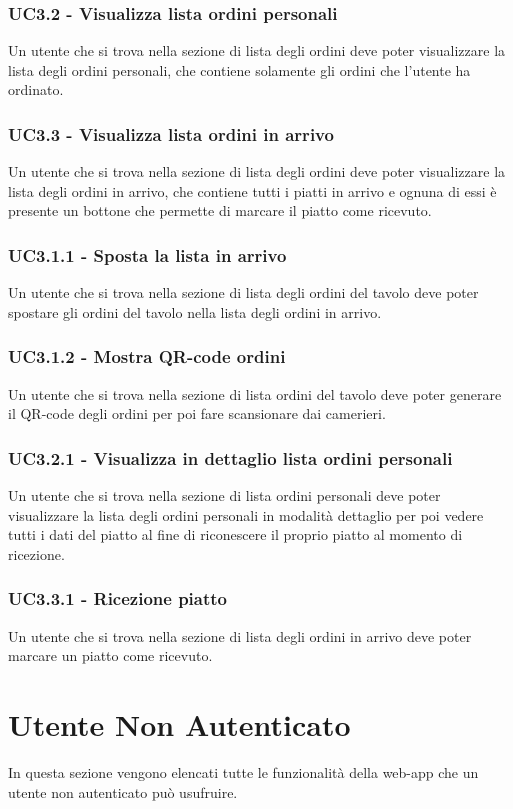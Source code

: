 \subsubsection{UC3.2 - Visualizza lista ordini personali}
Un utente che si trova nella sezione di lista degli ordini deve poter visualizzare la lista degli ordini personali, che contiene solamente gli ordini che l'utente ha ordinato.
\subsubsection{UC3.3 - Visualizza lista ordini in arrivo}
Un utente che si trova nella sezione di lista degli ordini deve poter visualizzare la lista degli ordini in arrivo, che contiene tutti i piatti in arrivo e ognuna di essi è presente un bottone che permette di marcare il piatto come ricevuto.
\subsubsection{UC3.1.1 - Sposta la lista in arrivo}
Un utente che si trova nella sezione di lista degli ordini del tavolo deve poter spostare gli ordini del tavolo nella lista degli ordini in arrivo.
\subsubsection{UC3.1.2 - Mostra QR-code ordini}
Un utente che si trova nella sezione di lista ordini del tavolo deve poter generare il QR-code degli ordini per poi fare scansionare dai camerieri.
\subsubsection{UC3.2.1 - Visualizza in dettaglio lista ordini personali}
Un utente che si trova nella sezione di lista ordini personali deve poter visualizzare la lista degli ordini personali in modalità dettaglio per poi vedere tutti i dati del piatto al fine di riconescere il proprio piatto al momento di ricezione.
\subsubsection{UC3.3.1 - Ricezione piatto}
Un utente che si trova nella sezione di lista degli ordini in arrivo deve poter marcare un piatto come ricevuto.
\section{Utente Non Autenticato}
In questa sezione vengono elencati tutte le funzionalità della web-app che un utente non autenticato può usufruire.
